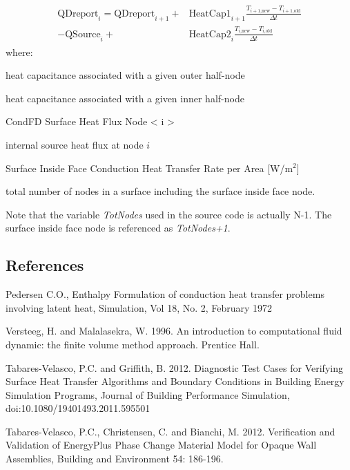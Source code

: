 \begin{align}
\begin{split}
\text{QDreport}_{i} = \text{QDreport}_{i+1}
+&\text{HeatCap1}_{i+1}\frac{T_{\text{$i+1$,new}} -
T_{\text{$i+1$,old}}}{\Delta t} \\
- \text{QSource}_{i}
+&\text{HeatCap2}_{i}
\frac{T_{\text{$i$,new}}-T_{\text{$i$,old}}}{\Delta t}
\end{split}
\end{align}
%
where:
\begin{wherelist}
\item[\text{HeatCap1}_i] heat capacitance associated with a given outer half-node
\item[\text{HeatCap2}_i] heat capacitance associated with a given inner half-node
\item[\text{QDreport}_i] CondFD Surface Heat Flux Node \textless{} i
\textgreater{}
\item[\text{QSource}_i] internal source heat flux at node $i$
\item[Q\textsubscript{inside}] Surface Inside Face Conduction Heat Transfer Rate
per Area {[}W/m\(^{2}\){]}
\item[N] total number of nodes in a surface including the surface inside face
node.
\end{wherelist}
%
Note that the variable \emph{TotNodes} used in the source code is actually N-1.
The surface inside face node is referenced as \emph{TotNodes+1}.


\subsection{References}\label{references-013}

Pedersen C.O., Enthalpy Formulation of conduction heat transfer problems involving latent heat, Simulation, Vol 18, No. 2, February 1972

Versteeg, H. and Malalasekra, W. 1996. An introduction to computational fluid dynamic: the finite volume method approach. Prentice Hall.

Tabares-Velasco, P.C. and Griffith, B. 2012. Diagnostic Test Cases for Verifying Surface Heat Transfer Algorithms and Boundary Conditions in Building Energy Simulation Programs, Journal of Building Performance Simulation, doi:10.1080/19401493.2011.595501

Tabares-Velasco, P.C., Christensen, C. and Bianchi, M. 2012. Verification and Validation of EnergyPlus Phase Change Material Model for Opaque Wall Assemblies, Building and Environment 54: 186-196.

